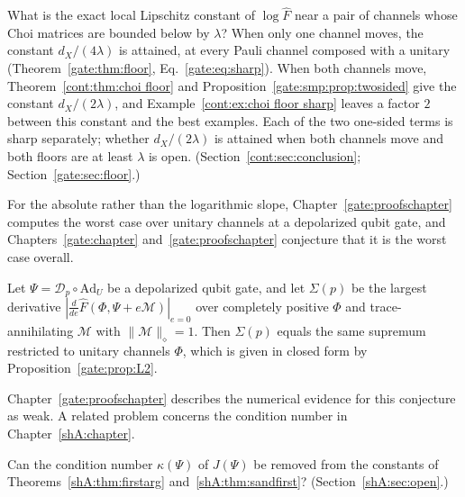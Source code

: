 \begin{problem}\label{op:prob:local lipschitz}
What is the exact local Lipschitz constant of $\log\widehat F$ near a pair of channels whose Choi matrices are bounded below by $\lambda$? When only one channel moves, the constant $d_X/(4\lambda)$ is attained, at every Pauli channel composed with a unitary (Theorem~\ref{gate:thm:floor}, Eq.~\eqref{gate:eq:sharp}). When both channels move, Theorem~\ref{cont:thm:choi floor} and Proposition~\ref{gate:smp:prop:twosided} give the constant $d_X/(2\lambda)$, and Example~\ref{cont:ex:choi floor sharp} leaves a factor $2$ between this constant and the best examples. Each of the two one-sided terms is sharp separately; whether $d_X/(2\lambda)$ is attained when both channels move and both floors are at least $\lambda$ is open. (Section~\ref{cont:sec:conclusion}; Section~\ref{gate:sec:floor}.)
\end{problem}

For the absolute rather than the logarithmic slope, Chapter~\ref{gate:proofschapter} computes the worst case over unitary channels at a depolarized qubit gate, and Chapters~\ref{gate:chapter} and~\ref{gate:proofschapter} conjecture that it is the worst case overall.

\begin{conjecture}\label{op:conj:L2}
Let $\Psi=\mathcal D_p\circ\mathrm{Ad}_U$ be a depolarized qubit gate, and let $\Sigma(p)$ be the largest derivative $|\frac{d}{de}\widehat F(\Phi,\Psi+e\mathcal M)|_{e=0}$ over completely positive $\Phi$ and trace-annihilating $\mathcal M$ with $\|\mathcal M\|_\diamond=1$. Then $\Sigma(p)$ equals the same supremum restricted to unitary channels $\Phi$, which is given in closed form by Proposition~\ref{gate:prop:L2}.
\end{conjecture}

\noindent Chapter~\ref{gate:proofschapter} describes the numerical evidence for this conjecture as weak. A related problem concerns the condition number in Chapter~\ref{shA:chapter}.

\begin{problem}\label{op:prob:condition number}
Can the condition number $\kappa(\Psi)$ of $J(\Psi)$ be removed from the constants of Theorems~\ref{shA:thm:firstarg} and~\ref{shA:thm:sandfirst}? (Section~\ref{shA:sec:open}.)
\end{problem}

